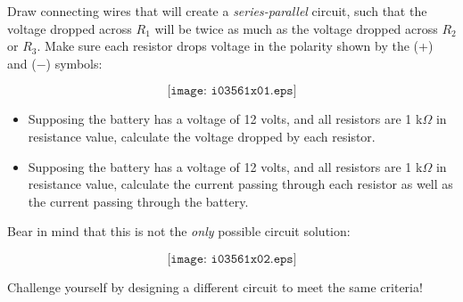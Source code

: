 

Draw connecting wires that will create a {\it series-parallel} circuit, such that the voltage dropped across $R_1$ will be twice as much as the voltage dropped across $R_2$ or $R_3$.  Make sure each resistor drops voltage in the polarity shown by the (+) and ($-$) symbols:

$$\texttt{[image: i03561x01.eps]}$$

\begin{itemize}
\item{} Supposing the battery has a voltage of 12 volts, and all resistors are 1 k$\Omega$ in resistance value, calculate the voltage dropped by each resistor.
\item{} Supposing the battery has a voltage of 12 volts, and all resistors are 1 k$\Omega$ in resistance value, calculate the current passing through each resistor as well as the current passing through the battery.
\end{itemize}







Bear in mind that this is not the {\it only} possible circuit solution:

$$\texttt{[image: i03561x02.eps]}$$

Challenge yourself by designing a different circuit to meet the same criteria! 











